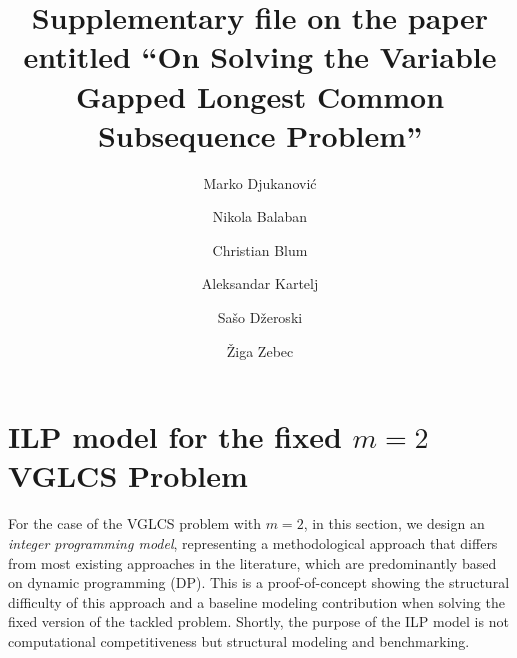 \documentclass[runningheads]{llncs}
\begin{document}
	\title{Supplementary file on the paper entitled ``On Solving the Variable Gapped Longest Common Subsequence Problem''}
	
		\author{
		Marko Djukanović  \and
		Nikola Balaban   \and
		Christian Blum  \and 
		Aleksandar Kartelj  \and
		Sašo Džeroski  \and
		Žiga Zebec
	}
	
	
	\maketitle
	\appendix
	\section{ILP model for the fixed $m=2$ VGLCS Problem}\label{app:ilp}
	
	For the case of the VGLCS problem with $m=2$, in this section, we design an
\emph{integer programming model}, representing a methodological approach that differs from
most existing approaches in the literature, which are predominantly based on dynamic
programming (DP). This is a proof-of-concept showing the structural difficulty of this approach and a baseline modeling contribution when solving the fixed version of the tackled problem. Shortly, the purpose of the ILP model is not computational competitiveness but structural modeling and benchmarking. \\
\end{document}
